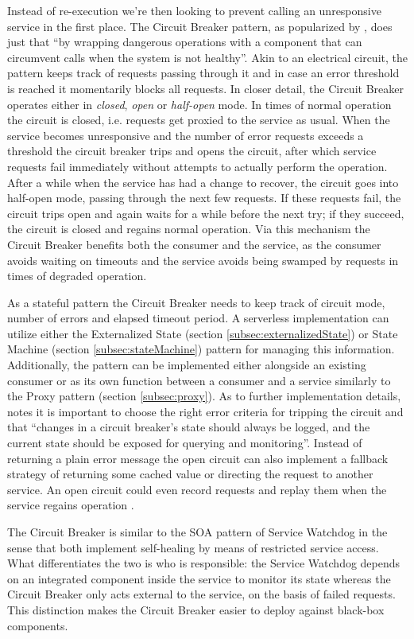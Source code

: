 Instead of re-execution we're then looking to prevent calling an unresponsive service in the first place. The Circuit Breaker pattern, as popularized by \textcite{nygard07releaseIt}, does just that ``by wrapping dangerous operations with a component that can circumvent calls when the system is not healthy''. Akin to an electrical circuit, the pattern keeps track of requests passing through it and in case an error threshold is reached it momentarily blocks all requests. In closer detail, the Circuit Breaker operates either in \textit{closed}, \textit{open} or \textit{half-open} mode. In times of normal operation the circuit is closed, i.e. requests get proxied to the service as usual. When the service becomes unresponsive and the number of error requests exceeds a threshold the circuit breaker trips and opens the circuit, after which service requests fail immediately without attempts to actually perform the operation. After a while when the service has had a change to recover, the circuit goes into half-open mode, passing through the next few requests. If these requests fail, the circuit trips open and again waits for a while before the next try; if they succeed, the circuit is closed and regains normal operation. Via this mechanism the Circuit Breaker benefits both the consumer and the service, as the consumer avoids waiting on timeouts and the service avoids being swamped by requests in times of degraded operation.

As a stateful pattern the Circuit Breaker needs to keep track of circuit mode, number of errors and elapsed timeout period. A serverless implementation can utilize either the Externalized State (section \ref{subsec:externalizedState}) or State Machine (section \ref{subsec:stateMachine}) pattern for managing this information. Additionally, the pattern can be implemented either alongside an existing consumer or as its own function between a consumer and a service similarly to the Proxy pattern (section \ref{subsec:proxy}). As to further implementation details, \textcite{nygard07releaseIt} notes it is important to choose the right error criteria for tripping the circuit and that ``changes in a circuit breaker’s state should always be logged, and the current state should be exposed for querying and monitoring''. Instead of returning a plain error message the open circuit can also implement a fallback strategy of returning some cached value or directing the request to another service. An open circuit could even record requests and replay them when the service regains operation \parencite{microsoft18cloudPatterns}.

The Circuit Breaker is similar to the SOA pattern of Service Watchdog \parencite{rotem12soa} in the sense that both implement self-healing by means of restricted service access. What differentiates the two is who is responsible: the Service Watchdog depends on an integrated component inside the service to monitor its state whereas the Circuit Breaker only acts external to the service, on the basis of failed requests. This distinction makes the Circuit Breaker easier to deploy against black-box components.

